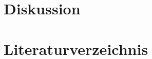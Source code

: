 \newpage
\section{Diskussion}
	\label{sec:diskussion}

\section{Literaturverzeichnis}
\label{sec:literaturverzeichnis}
